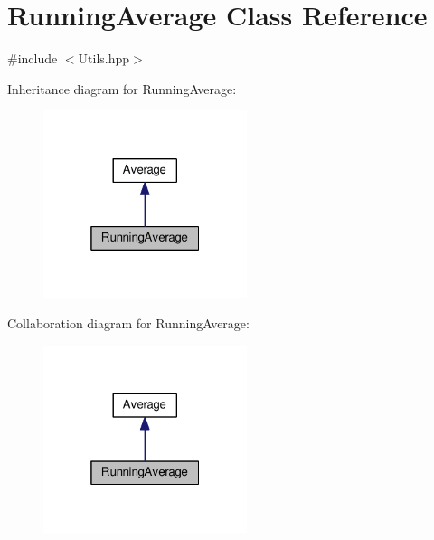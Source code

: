 \hypertarget{classRunningAverage}{}\section{Running\+Average Class Reference}
\label{classRunningAverage}


{\ttfamily \#include $<$Utils.\+hpp$>$}



Inheritance diagram for Running\+Average\+:\nopagebreak
\begin{figure}[H]
\begin{center}
\leavevmode
\includegraphics[width=169pt]{classRunningAverage__inherit__graph}
\end{center}
\end{figure}


Collaboration diagram for Running\+Average\+:\nopagebreak
\begin{figure}[H]
\begin{center}
\leavevmode
\includegraphics[width=169pt]{classRunningAverage__coll__graph}
\end{center}
\end{figure}
